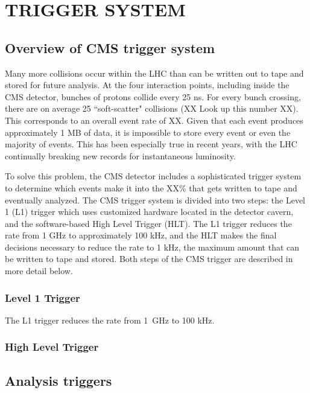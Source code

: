 \chapter{TRIGGER SYSTEM}
\label{chap:Trigger}

\section{Overview of CMS trigger system}
\label{sec:trigOverview}
Many more collisions occur within the LHC than can be written out to tape and stored for future analysis. At the four interaction points, including inside the CMS detector, bunches of protons collide every 25 ns. For every bunch crossing, there are on average 25 ``soft-scatter" collisions (XX Look up this number XX). This corresponds to an overall event rate of XX. Given that each event produces approximately 1 MB of data, it is impossible to store every event or even the majority of events. This has been especially true in recent years, with the LHC continually breaking new records for instantaneous luminosity. 

To solve this problem, the CMS detector includes a sophisticated trigger system to determine which events make it into the XX\% that gets written to tape and eventually analyzed. The CMS trigger system is divided into two steps: the Level 1 (L1) trigger which uses customized hardware located in the detector cavern, and the software-based High Level Trigger (HLT). The L1 trigger reduces the rate from 1 GHz to approximately 100 kHz, and the HLT makes the final decisions necessary to reduce the rate to 1 kHz, the maximum amount that can be written to tape and stored. Both steps of the CMS trigger are described in more detail below.

\subsection{Level 1 Trigger}
\label{sec:L1}
The L1 trigger reduces the rate from 1~GHz to 100 kHz. 

\subsection{High Level Trigger}
\label{HLT}


\section{Analysis triggers}
\label{sec:trigRequirements}

